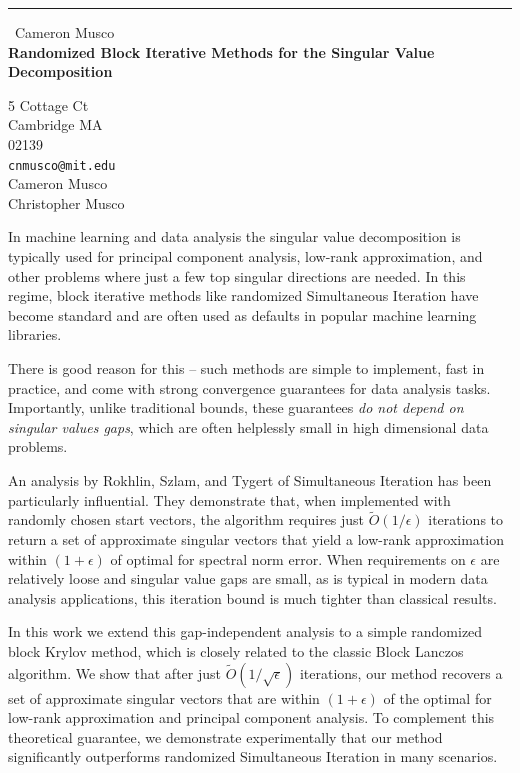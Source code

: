 \documentclass{report}
\begin{document}
\begin{center}
\rule{6in}{1pt} \
{\large Cameron Musco \\
{\bf Randomized Block Iterative Methods for the Singular Value Decomposition}}

5 Cottage Ct \\ Cambridge MA \\ 02139
\\
{\tt cnmusco@mit.edu}\\
Cameron Musco\\
Christopher Musco\end{center}

In machine learning and data analysis the singular value decomposition is
typically used for principal component analysis, low-rank approximation,
and other problems where just a few top singular directions are needed.
In this regime, block iterative methods like randomized Simultaneous
Iteration have become standard and are often used as defaults in popular
machine learning libraries.

There is good reason for this -- such methods are simple to implement,
fast in practice, and come with strong convergence guarantees for data
analysis tasks. Importantly, unlike traditional bounds, these guarantees
\emph{do not depend on singular values gaps}, which are often helplessly
small in high dimensional data problems.

An analysis by Rokhlin, Szlam, and Tygert of Simultaneous Iteration has
been particularly influential. They demonstrate that, when implemented
with randomly chosen start vectors, the algorithm requires just $\tilde
O(1/\epsilon)$ iterations to return a set of approximate singular vectors
that yield a low-rank approximation within $(1+\epsilon)$ of optimal for
spectral norm error. When requirements on $\epsilon$ are relatively loose
and singular value gaps are small, as is typical in modern data analysis
applications, this iteration bound is much tighter than classical
results.

In this work we extend this gap-independent analysis to a simple
randomized block Krylov method, which is closely related to the classic
Block Lanczos algorithm.
We show that after just $\tilde O(1/\sqrt{\epsilon})$ iterations, our
method recovers a set of approximate singular vectors that are within
$(1+\epsilon)$ of the optimal for low-rank approximation and principal
component analysis. To complement this theoretical guarantee, we
demonstrate experimentally that our method significantly outperforms
randomized Simultaneous Iteration in many scenarios.
\end{document}
